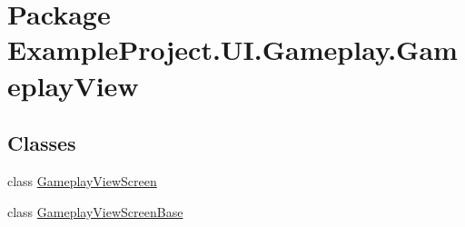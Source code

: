 \hypertarget{namespace_example_project_1_1_u_i_1_1_gameplay_1_1_gameplay_view}{}\section{Package Example\+Project.\+U\+I.\+Gameplay.\+Gameplay\+View}
\label{namespace_example_project_1_1_u_i_1_1_gameplay_1_1_gameplay_view}
\subsection*{Classes}
\begin{DoxyCompactItemize}
\item 
class \hyperlink{class_example_project_1_1_u_i_1_1_gameplay_1_1_gameplay_view_1_1_gameplay_view_screen}{Gameplay\+View\+Screen}
\item 
class \hyperlink{class_example_project_1_1_u_i_1_1_gameplay_1_1_gameplay_view_1_1_gameplay_view_screen_base}{Gameplay\+View\+Screen\+Base}
\end{DoxyCompactItemize}
